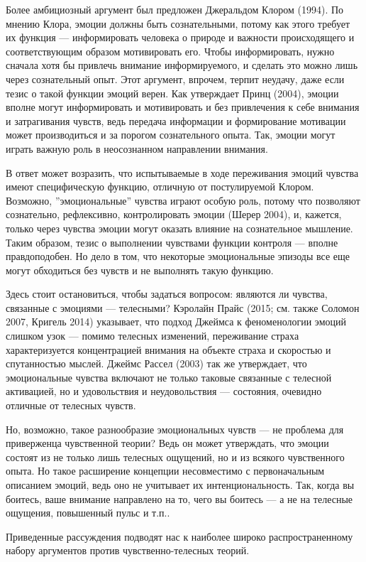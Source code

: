 \documentclass[11pt]{book}
\begin{document}
Более амбициозный аргумент был предложен Джеральдом Клором (1994). По мнению Клора, эмоции должны быть сознательными, потому как этого требует их функция --- информировать человека о природе и важности происходящего и соответствующим образом мотивировать его. Чтобы информировать, нужно сначала хотя бы привлечь внимание информируемого, и сделать это можно лишь через сознательный опыт. Этот аргумент, впрочем, терпит неудачу, даже если тезис о такой функции эмоций верен. Как утверждает Принц (2004), эмоции вполне могут информировать и мотивировать и без привлечения к себе внимания и затрагивания чувств, ведь передача информации и формирование мотивации может производиться и за порогом сознательного опыта. Так, эмоции могут играть важную роль в неосознанном направлении внимания.

В ответ может возразить, что испытываемые в ходе переживания эмоций чувства имеют специфическую функцию, отличную от постулируемой Клором. Возможно, ''эмоциональные'' чувства играют особую роль, потому что позволяют сознательно, рефлексивно, контролировать эмоции (Шерер 2004), и, кажется, только через чувства эмоции могут оказать влияние на сознательное мышление. Таким образом, тезис о выполнении чувствами функции контроля --- вполне правдоподобен. Но дело в том, что некоторые эмоциональные эпизоды все еще могут обходиться без чувств и не выполнять такую функцию.

Здесь стоит остановиться, чтобы задаться вопросом: являются ли чувства, связанные с эмоциями --- телесными? Кэролайн Прайс (2015; см. также Соломон 2007, Кригель 2014) указывает, что подход Джеймса к феноменологии эмоций слишком узок --- помимо телесных изменений, переживание страха характеризуется концентрацией внимания на объекте страха и скоростью и спутанностью мыслей. Джеймс Рассел (2003) так же утверждает, что эмоциональные чувства включают не только таковые связанные с телесной активацией, но и удовольствия и неудовольствия --- состояния, очевидно отличные от телесных чувств.

Но, возможно, такое разнообразие эмоциональных чувств --- не проблема для приверженца чувственной теории? Ведь он может утверждать, что эмоции состоят из не только лишь телесных ощущений, но и из всякого чувственного опыта. Но такое расширение концепции несовместимо с первоначальным описанием эмоций, ведь оно не учитывает их интенциональность. Так, когда вы боитесь, ваше внимание направлено на то, чего вы боитесь --- а не на телесные ощущения, повышенный пульс и т.п..

Приведенные рассуждения подводят нас к наиболее широко распространенному набору аргументов против чувственно-телесных теорий.
\end{document}
